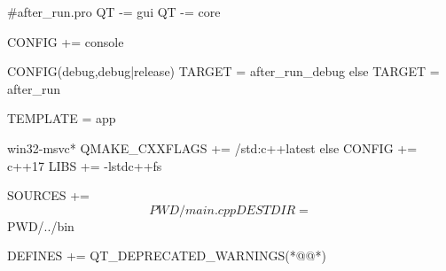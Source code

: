 \label{f000006}    %
\FloatBarrier                                  %
\begin{thebookfilesourceone}[escapeinside={(*@}{@*)},
caption=GoodLuck,
title=\filesourcenumbernameone \thefilesourcenumber
]
#after_run.pro
QT -= gui
QT -= core

CONFIG += console

CONFIG(debug,debug|release){
    TARGET = after_run_debug
}else{
    TARGET = after_run
}

TEMPLATE = app

win32-msvc*{
    QMAKE_CXXFLAGS += /std:c++latest
}else{
    CONFIG += c++17
    LIBS += -lstdc++fs
}

SOURCES += $$PWD/main.cpp
DESTDIR =  $$PWD/../bin

DEFINES += QT_DEPRECATED_WARNINGS(*@\marginpar[\hfill\setlength\fboxsep{2pt}\fbox{\footnotesize{\kaishu\parbox{1em}{\setlength{\baselineskip}{2pt}\filesourcenumbernameone}}\footnotesize{\thefilesourcenumber}}]{\setlength\fboxsep{2pt}\fbox{\footnotesize{\kaishu\parbox{1em}{\setlength{\baselineskip}{2pt}\filesourcenumbernameone}}\footnotesize{\thefilesourcenumber}}}@*)\end{thebookfilesourceone}          %
\addtocounter{lstlisting}{-1}   %
\label{f000007}    %
\FloatBarrier                                  %
